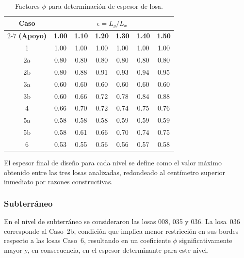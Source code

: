 \begin{table}[H]
    \centering
    \caption{Factores $\phi$ para determinación de espesor de losa.}
    \label{tab:factores_phi}
    \begin{tabular}{ccccccc}
        \toprule
        \textbf{Caso} & \multicolumn{6}{c}{$\epsilon = L_y / L_x$} \\
        \cmidrule(lr){2-7}
        \textbf{(Apoyo)} & \textbf{1.00} & \textbf{1.10} & \textbf{1.20} 
        & \textbf{1.30} & \textbf{1.40} & \textbf{1.50} \\
        \midrule
        1   & 1.00 & 1.00 & 1.00 & 1.00 & 1.00 & 1.00 \\
        2a  & 0.80 & 0.80 & 0.80 & 0.80 & 0.80 & 0.80 \\
        2b  & 0.80 & 0.88 & 0.91 & 0.93 & 0.94 & 0.95 \\
        3a  & 0.60 & 0.60 & 0.60 & 0.60 & 0.60 & 0.60 \\
        3b  & 0.60 & 0.66 & 0.72 & 0.78 & 0.84 & 0.88 \\
        4   & 0.66 & 0.70 & 0.72 & 0.74 & 0.75 & 0.76 \\
        5a  & 0.58 & 0.58 & 0.58 & 0.59 & 0.59 & 0.59 \\
        5b  & 0.58 & 0.61 & 0.66 & 0.70 & 0.74 & 0.75 \\
        6   & 0.53 & 0.55 & 0.56 & 0.56 & 0.57 & 0.58 \\
        \bottomrule
    \end{tabular}
\end{table}

El espesor final de diseño para cada nivel se define como el valor máximo 
obtenido entre las tres losas analizadas, redondeado al centímetro superior 
inmediato por razones constructivas.

\subsubsection{Subterráneo}

En el nivel de subterráneo se consideraron las losas 008, 035 y 036. La 
losa~036 corresponde al Caso~2b, condición que implica menor restricción en 
sus bordes respecto a las losas Caso~6, resultando en un coeficiente $\phi$ 
significativamente mayor y, en consecuencia, en el espesor determinante para 
este nivel.


